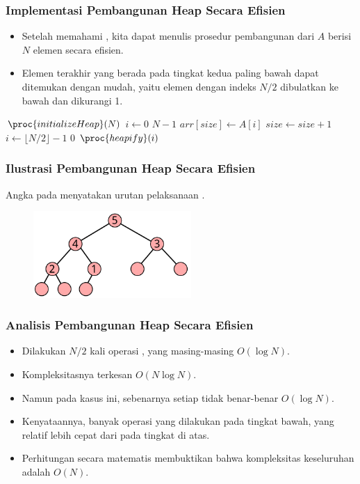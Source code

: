 \begin{frame}
\frametitle{Implementasi Pembangunan Heap Secara Efisien}
\begin{itemize}
  \item Setelah memahami , kita dapat menulis prosedur pembangunan \pheap dari \farray $A$ berisi $N$ elemen secara efisien.
  \item Elemen terakhir yang berada pada tingkat kedua paling bawah dapat ditemukan dengan mudah, yaitu elemen dengan indeks $N/2$ dibulatkan ke bawah dan dikurangi 1.
\end{itemize}
\begin{codebox}
\li $\proc{initializeHeap}(N)$
\li \For $i \gets 0$ \To $N-1$ \Do
\li   $arr[size] \gets A[i]$
\li   $size \gets size + 1$
    \End
\li \For $i \gets \lfloor N/2 \rfloor - 1$ \To $0$ \Do
\li   $\proc{heapify}(i)$
    \End
\end{codebox}

\end{frame}

\begin{frame}
\frametitle{Ilustrasi Pembangunan Heap Secara Efisien}
Angka pada \fnode menyatakan urutan pelaksanaan .
\begin{figure}
  \includegraphics[width=6cm]{asset/make-heap.pdf}
\end{figure}
\end{frame}

\begin{frame}
\frametitle{Analisis Pembangunan Heap Secara Efisien}
\begin{itemize}
  \item Dilakukan $N/2$ kali operasi , yang masing-masing $O(\log{N})$.
  \item Kompleksitasnya terkesan $O(N \log{N})$.
  \item Namun pada kasus ini, sebenarnya setiap  tidak benar-benar $O(\log{N})$.
  \item Kenyataannya, banyak operasi  yang dilakukan pada tingkat bawah, yang relatif lebih cepat dari  pada tingkat di atas.
  \item Perhitungan secara matematis membuktikan bahwa kompleksitas keseluruhan  adalah $O(N)$.
\end{itemize}
\end{frame}

